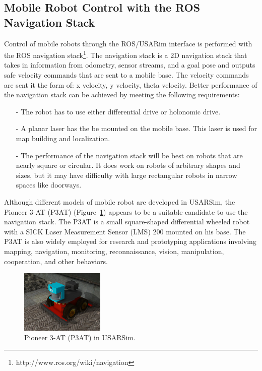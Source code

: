 \subsection*{Mobile Robot Control with the ROS Navigation Stack}
Control of mobile robots through the ROS/USARim interface is performed with the ROS navigation stack\footnote{http://www.ros.org/wiki/navigation}. The navigation stack is a 2D navigation stack that takes in information from odometry, sensor streams, and a goal pose and outputs safe velocity commands that are sent to a mobile base. The velocity commands are sent it the form of: x velocity, y velocity, theta velocity. Better performance of the navigation stack can be achieved by meeting the following requirements:
\begin{itemize}
\item[-] The robot has to use either differential drive or holonomic drive.
\item[-] A planar laser has the be mounted on the mobile base. This laser is used for map building and localization.
\item[-] The performance of the navigation stack will be best on robots that are nearly square or circular. It does work on robots of arbitrary shapes and sizes, but it may have difficulty with large rectangular robots in narrow spaces like doorways.
\end{itemize}

Although different models of mobile robot are developed in USARSim, the Pioneer 3-AT (P3AT) (Figure~\ref{fig:p3at}) appears to be a suitable candidate to use the navigation stack. The P3AT is a small square-shaped differential wheeled robot with a SICK Laser Measurement Sensor (LMS) 200 mounted on his base. The P3AT is also widely employed for research and prototyping applications involving mapping, navigation, monitoring, reconnaissance, vision, manipulation, cooperation, and other behaviors.

\begin{figure}[t!]
\centering
\includegraphics[width=4cm]{Figures/Robots/p3at.jpg}
\caption{Pioneer 3-AT (P3AT) in USARSim.}\label{fig:p3at}
\end{figure}




